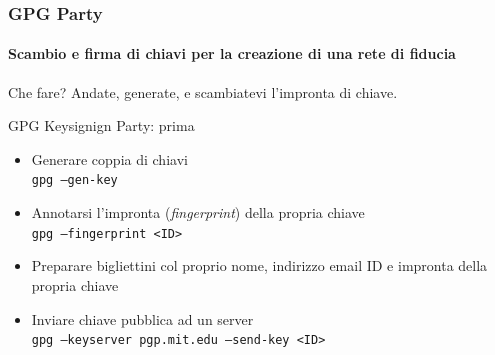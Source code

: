 \documentclass{beamer}
\begin{document}
\begin{frame}
  \frametitle{GPG Party}
  \framesubtitle{Scambio e firma di chiavi per la creazione di una rete di fiducia}

  \begin{block}{Che fare?}
    Andate, generate, e scambiatevi l'impronta di chiave.
  \end{block}

  \pause

  \begin{exampleblock}{GPG Keysignign Party: prima}
    \begin{itemize}
      \item Generare coppia di chiavi\\
            \tiny \texttt{gpg --gen-key} \normalsize
      \item Annotarsi l'impronta (\emph{fingerprint}) della propria chiave\\
            \tiny \texttt{gpg --fingerprint <ID>} \normalsize
      \item Preparare bigliettini col proprio nome, indirizzo email
            ID e impronta della propria chiave
      \item Inviare chiave pubblica ad un server\\
            \tiny \texttt{gpg --keyserver pgp.mit.edu --send-key <ID>} \normalsize
    \end{itemize}
  \end{exampleblock}

\end{frame}
\end{document}

